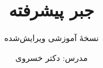 \documentclass[notheorems,aspectratio=1610,t]{beamer}
\title{جبر پیشرفته}
\subtitle{نسخهٔ آموزشی ویرایش‌شده}
\author{مدرس: دکتر خسروی}
\date{}
\begin{document}
\small
\begin{frame}
  \titlepage
\end{frame}
\ifdefined\AlgebraLectureNumber
  \setcounter{section}{\numexpr\AlgebraLectureNumber-1\relax}
  
\else
  
\fi
\end{document}
